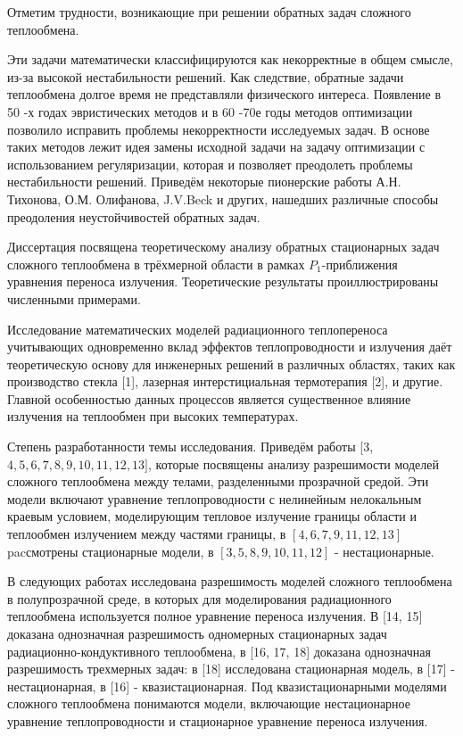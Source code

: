 \documentclass[10pt]{article}
\begin{document}
Отметим трудности, возникающие при решении обратных задач сложного теплообмена.

Эти задачи математически классифицируются как некорректные в общем смысле, из-за высокой нестабильности решений. Как следствие, обратные задачи теплообмена долгое время не представляли физического интереса. Появление в 50 -х годах эвристических методов и в 60 -70е годы методов оптимизации позволило исправить проблемы некорректности исследуемых задач. В основе таких методов лежит идея замены исходной задачи на задачу оптимизации с использованием регуляризации, которая и позволяет преодолеть проблемы нестабильности решений. Приведём некоторые пионерские работы А.Н. Тихонова, О.М. Олифанова, J.V.Beck и других, нашедших различные способы преодоления неустойчивостей обратных задач.

Диссертация посвящена теоретическому анализу обратных стационарных задач сложного теплообмена в трёхмерной области в рамках $P_{1}$-приближения уравнения переноса излучения. Теоретические результаты проиллюстрированы численными примерами.

Исследование математических моделей радиационного теплопереноса учитывающих одновременно вклад эффектов теплопроводности и излучения даёт теоретическую основу для инженерных решений в различных областях, таких как производство стекла [1], лазерная интерстициальная термотерапия [2], и другие. Главной особенностью данных процессов является существенное влияние излучения на теплообмен при высоких температурах.

Степень разработанности темы исследования. Приведём работы [3, $4,5,6,7,8,9,10,11,12,13]$, которые посвящены анализу разрешимости моделей сложного теплообмена между телами, разделенными прозрачной средой. Эти модели включают уравнение теплопроводности с нелинейным нелокальным краевым условием, моделирующим тепловое излучение границы области и теплообмен излучением между частями границы, в $[4,6,7,9,11,12,13]$ pacсмотрены стационарные модели, в $[3,5,8,9,10,11,12]$ - нестационарные.

В следующих работах исследована разрешимость моделей сложного теплообмена в полупрозрачной среде, в которых для моделирования радиационного теплообмена используется полное уравнение переноса излучения. В [14, 15] доказана однозначная разрешимость одномерных стационарных задач радиационно-кондуктивного теплообмена, в [16, 17, 18] доказана однозначная разрешимость трехмерных задач: в [18] исследована стационарная модель, в [17] - нестационарная, в [16] - квазистационарная. Под квазистационарными моделями сложного теплообмена понимаются модели, включающие нестационарное уравнение теплопроводности и стационарное уравнение переноса излучения.
\end{document}
